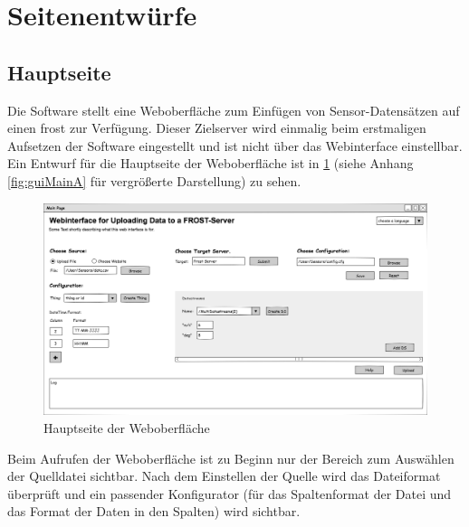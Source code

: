 \documentclass[a4paper, 12 pt]{article}
\begin{document}

\section{Seitenentwürfe}

\subsection{Hauptseite}
Die Software stellt eine Weboberfläche zum Einfügen von Sensor-Datensätzen auf einen \gls{frost} zur Verfügung. 
Dieser Zielserver wird einmalig beim erstmaligen Aufsetzen der Software eingestellt und ist nicht über das Webinterface einstellbar. 
Ein Entwurf für die Hauptseite der Weboberfläche ist in \cref{fig:guiMain} (siehe Anhang \cref{fig:guiMainA} für vergrößerte Darstellung) zu sehen.
\\

\begin{figure}[htbp]
\centering
\includegraphics[scale=0.4]{images/gui}
\caption{\label{fig:guiMain}Hauptseite der Weboberfläche}
\end{figure}
Beim Aufrufen der Weboberfläche ist zu Beginn nur der Bereich zum Auswählen der Quelldatei sichtbar. 
Nach dem Einstellen der Quelle wird das Dateiformat überprüft und ein passender Konfigurator (für das Spaltenformat der Datei und das Format der Daten in den Spalten) wird sichtbar. \\
\end{document}

